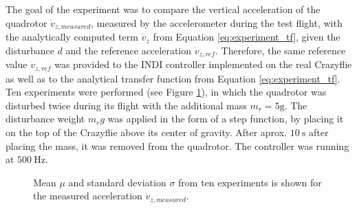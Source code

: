 \documentclass[11pt, a4paper, twoside]{report}
\begin{document}
The goal of the experiment was to compare the vertical acceleration of the quadrotor $\dot{v}_{z,measured}$, measured by the accelerometer during the test flight, with the analytically computed term $\dot{v}_{z}$ from Equation \ref{eq:experiment_tf}, given the disturbance $d$ and the reference acceleration $\dot{v}_{z,ref}$. Therefore, the same reference value $\dot{v}_{z,ref}$ was provided to the \acrshort{INDI} controller implemented on the real Crazyflie as well as to the analytical transfer function from Equation \ref{eq:experiment_tf}. Ten experiments were performed (see Figure \ref{fig:mean_std}), in which the quadrotor was disturbed twice during its flight with the additional mass $m_r=5\si{\g}$. The disturbance weight $m_rg$ was applied in the form of a step function, by placing it on the top of the Crazyflie above its center of gravity. After aprox. $10~\si{\s}$ after placing the mass, it was removed from the quadrotor. The controller was running at $500~\si{\Hz}$.

\begin{figure}[H]
	\centering 
	\captionsetup{justification=centering, singlelinecheck=off, font=bf, belowskip=-0.5cm}
	\caption[Measured acceleration from ten experiments]{Mean $\mu$ and standard deviation $\sigma$ from ten experiments is shown for the measured acceleration $\dot{v}_{z,measured}$.}
	\label{fig:mean_std}
\end{figure}
\end{document}
